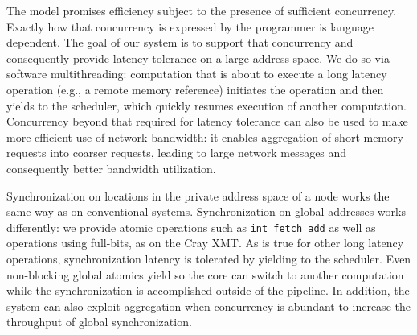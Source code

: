 \documentclass[10pt,nocopyrightspace]{sigplanconf}
\begin{document}


The model promises efficiency subject to the presence of sufficient
concurrency.  Exactly how that concurrency is expressed by the
programmer is language dependent. The goal of our system is to support
that concurrency and consequently provide latency tolerance on a large
address space. We do so via software multithreading: computation that
is about to execute a long latency operation (e.g., a remote memory
reference) initiates the operation and then yields to the scheduler,
which quickly resumes execution of another computation. Concurrency 
beyond that required for latency tolerance
can also be used to make more efficient use of network bandwidth: it
enables aggregation of short memory requests into coarser requests,
leading to large network messages and consequently better
bandwidth utilization.


Synchronization on locations in the private address space of a node
works the same way as on conventional systems.  Synchronization on
global addresses works differently: we provide atomic operations such
as {\tt int\_fetch\_add} as well as operations using full-bits, as on
the Cray {\small XMT}.  As is true for other long latency operations,
synchronization latency is tolerated by yielding to the scheduler.
Even non-blocking global atomics yield so the core can switch to
another computation while the synchronization is accomplished outside
of the pipeline.  In addition, the system can also exploit aggregation
when concurrency is abundant to increase the throughput of global
synchronization.
\end{document}
